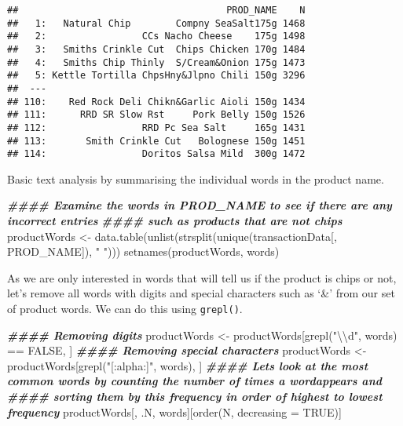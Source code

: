 \documentclass[
]{article}
\newenvironment{Shaded}{\begin{snugshade}}{\end{snugshade}}
\newcommand{\AttributeTok}[1]{\textcolor[rgb]{0.77,0.63,0.00}{#1}}
\newcommand{\ConstantTok}[1]{\textcolor[rgb]{0.00,0.00,0.00}{#1}}
\newcommand{\DocumentationTok}[1]{\textcolor[rgb]{0.56,0.35,0.01}{\textbf{\textit{#1}}}}
\newcommand{\FunctionTok}[1]{\textcolor[rgb]{0.00,0.00,0.00}{#1}}
\newcommand{\NormalTok}[1]{#1}
\newcommand{\OtherTok}[1]{\textcolor[rgb]{0.56,0.35,0.01}{#1}}
\newcommand{\SpecialCharTok}[1]{\textcolor[rgb]{0.00,0.00,0.00}{#1}}
\newcommand{\StringTok}[1]{\textcolor[rgb]{0.31,0.60,0.02}{#1}}
\begin{document}
\begin{verbatim}
##                                     PROD_NAME    N
##   1:   Natural Chip        Compny SeaSalt175g 1468
##   2:                 CCs Nacho Cheese    175g 1498
##   3:   Smiths Crinkle Cut  Chips Chicken 170g 1484
##   4:   Smiths Chip Thinly  S/Cream&Onion 175g 1473
##   5: Kettle Tortilla ChpsHny&Jlpno Chili 150g 3296
##  ---                                              
## 110:    Red Rock Deli Chikn&Garlic Aioli 150g 1434
## 111:      RRD SR Slow Rst     Pork Belly 150g 1526
## 112:                 RRD Pc Sea Salt     165g 1431
## 113:       Smith Crinkle Cut   Bolognese 150g 1451
## 114:                 Doritos Salsa Mild  300g 1472
\end{verbatim}

Basic text analysis by summarising the individual words in the product
name.

\begin{Shaded}
\begin{Highlighting}[]
\DocumentationTok{\#\#\#\# Examine the words in PROD\_NAME to see if there are any incorrect entries}
\DocumentationTok{\#\#\#\# such as products that are not chips}
\NormalTok{productWords }\OtherTok{\textless{}{-}} \FunctionTok{data.table}\NormalTok{(}\FunctionTok{unlist}\NormalTok{(}\FunctionTok{strsplit}\NormalTok{(}\FunctionTok{unique}\NormalTok{(transactionData[, PROD\_NAME]), }\StringTok{" "}\NormalTok{)))}
\FunctionTok{setnames}\NormalTok{(productWords, }\StringTok{\textquotesingle{}words\textquotesingle{}}\NormalTok{)}
\end{Highlighting}
\end{Shaded}

As we are only interested in words that will tell us if the product is
chips or not, let's remove all words with digits and special characters
such as `\&' from our set of product words. We can do this using
\texttt{grepl()}.

\begin{Shaded}
\begin{Highlighting}[]
\DocumentationTok{\#\#\#\# Removing digits}
\NormalTok{productWords }\OtherTok{\textless{}{-}}\NormalTok{ productWords[}\FunctionTok{grepl}\NormalTok{(}\StringTok{"}\SpecialCharTok{\textbackslash{}\textbackslash{}}\StringTok{d"}\NormalTok{, words) }\SpecialCharTok{==} \ConstantTok{FALSE}\NormalTok{, ]}
\DocumentationTok{\#\#\#\# Removing special characters}
\NormalTok{productWords }\OtherTok{\textless{}{-}}\NormalTok{ productWords[}\FunctionTok{grepl}\NormalTok{(}\StringTok{"[:alpha:]"}\NormalTok{, words), ]}
\DocumentationTok{\#\#\#\# Let\textquotesingle{}s look at the most common words by counting the number of times a wordappears and}
\DocumentationTok{\#\#\#\# sorting them by this frequency in order of highest to lowest frequency}
\NormalTok{productWords[, .N, words][}\FunctionTok{order}\NormalTok{(N, }\AttributeTok{decreasing =} \ConstantTok{TRUE}\NormalTok{)]}
\end{Highlighting}
\end{Shaded}
\end{document}
